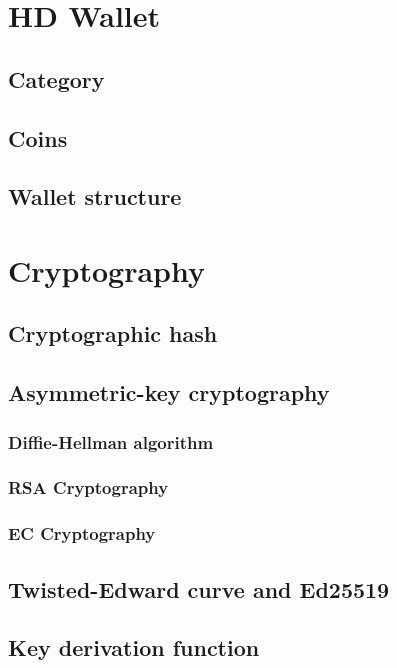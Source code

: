 \section{HD Wallet}
\label{sec:hd_wallet}

\subsection{Category}

\subsection{Coins}

\subsection{Wallet structure}

\section{Cryptography}

\subsection{Cryptographic hash}
\label{sec:crypto_hash}

\subsection{Asymmetric-key cryptography}
\label{sec:asymmetric_cryptography}

\subsubsection{Diffie-Hellman algorithm}

\subsubsection{RSA Cryptography}

\subsubsection{EC Cryptography}

\subsection{Twisted-Edward curve and Ed25519}

\subsection{Key derivation function}
